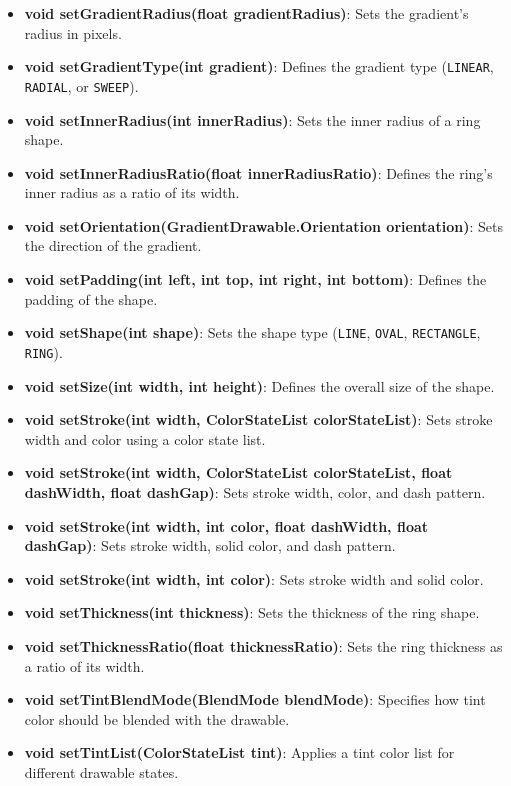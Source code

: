 \documentclass{report}
\begin{document}
\begin{itemize}
\begin{itemize}
            \item \textbf{void setGradientRadius(float gradientRadius)}: Sets the gradient’s radius in pixels.
            \item \textbf{void setGradientType(int gradient)}: Defines the gradient type (\texttt{LINEAR}, \texttt{RADIAL}, or \texttt{SWEEP}).
            \item \textbf{void setInnerRadius(int innerRadius)}: Sets the inner radius of a ring shape.
            \item \textbf{void setInnerRadiusRatio(float innerRadiusRatio)}: Defines the ring’s inner radius as a ratio of its width.
            \item \textbf{void setOrientation(GradientDrawable.Orientation orientation)}: Sets the direction of the gradient.
            \item \textbf{void setPadding(int left, int top, int right, int bottom)}: Defines the padding of the shape.
            \item \textbf{void setShape(int shape)}: Sets the shape type (\texttt{LINE}, \texttt{OVAL}, \texttt{RECTANGLE}, \texttt{RING}).
            \item \textbf{void setSize(int width, int height)}: Defines the overall size of the shape.
            \item \textbf{void setStroke(int width, ColorStateList colorStateList)}: Sets stroke width and color using a color state list.
            \item \textbf{void setStroke(int width, ColorStateList colorStateList, float dashWidth, float dashGap)}: Sets stroke width, color, and dash pattern.
            \item \textbf{void setStroke(int width, int color, float dashWidth, float dashGap)}: Sets stroke width, solid color, and dash pattern.
            \item \textbf{void setStroke(int width, int color)}: Sets stroke width and solid color.
            \item \textbf{void setThickness(int thickness)}: Sets the thickness of the ring shape.
            \item \textbf{void setThicknessRatio(float thicknessRatio)}: Sets the ring thickness as a ratio of its width.
            \item \textbf{void setTintBlendMode(BlendMode blendMode)}: Specifies how tint color should be blended with the drawable.
            \item \textbf{void setTintList(ColorStateList tint)}: Applies a tint color list for different drawable states.

\end{itemize}
\end{itemize}
\end{document}
